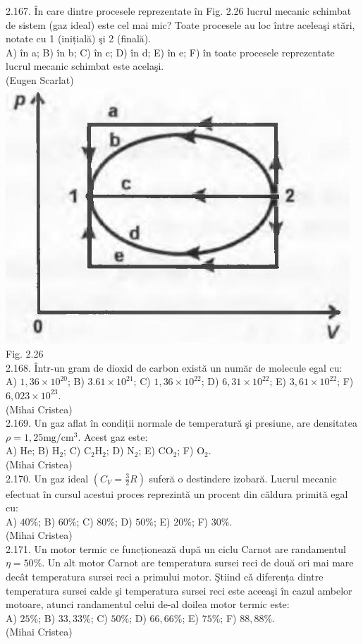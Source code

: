 2.167. În care dintre procesele reprezentate în Fig. 2.26 lucrul mecanic schimbat de sistem (gaz ideal) este cel mai mic? Toate procesele au loc între aceleaşi stări, notate cu 1 (inițială) şi 2 (finală).\\ A) în a; B) în b; C) în c; D) în d; E) în e; F) în toate procesele reprezentate lucrul mecanic schimbat este acelaşi.\\ (Eugen Scarlat)\\ \includegraphics[width=0.4\linewidth]{images/2025_07_01_5b3ff9fa0d508c8e9f17g-111(1)} Fig. 2.26\\

2.168. Într-un gram de dioxid de carbon există un număr de molecule egal cu:\\ A) $1,36 \times 10^{20}$; B) $3.61 \times 10^{21}$; C) $1,36 \times 10^{22}$; D) $6,31 \times 10^{22}$; E) $3,61 \times 10^{22}$; F) $6,023 \times 10^{23}$.\\ (Mihai Cristea)\\

2.169. Un gaz aflat în condiții normale de temperatură şi presiune, are densitatea $\rho=1,25 \mathrm{mg} / \mathrm{cm}^{3}$. Acest gaz este:\\ A) He; B) $\mathrm{H}_{2}$; C) $\mathrm{C}_{2} \mathrm{H}_{2}$; D) $\mathrm{N}_{2}$; E) $\mathrm{CO}_{2}$; F) $\mathrm{O}_{2}$.\\ (Mihai Cristea)\\

2.170. Un gaz ideal $\left(C_{V}=\frac{3}{2} R\right)$ suferă o destindere izobară. Lucrul mecanic efectuat în cursul acestui proces reprezintă un procent din căldura primită egal cu:\\ A) $40 \%$; B) $60 \%$; C) $80 \%$; D) $50 \%$; E) $20 \%$; F) $30 \%$.\\ (Mihai Cristea)\\

2.171. Un motor termic ce funcționează după un ciclu Carnot are randamentul $\eta=50 \%$. Un alt motor Carnot are temperatura sursei reci de două ori mai mare decât temperatura sursei reci a primului motor. Ştiind cǎ diferența dintre temperatura sursei calde şi temperatura sursei reci este aceeaşi în cazul ambelor motoare, atunci randamentul celui de-al doilea motor termic este:\\ A) $25 \%$; B) $33,33 \%$; C) $50 \%$; D) $66,66 \%$; E) $75 \%$; F) $88,88 \%$.\\ (Mihai Cristea)\\

